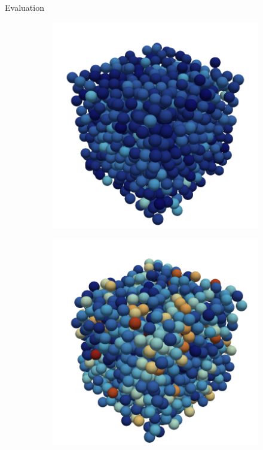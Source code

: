 \begin{frame}[c]{Evaluation}{}
{\begin{figure}[htpb]
\begin{subfigure}[c]{.3\textwidth}
			\includegraphics[width=\textwidth]{equilibrium/render/t10000.png}
		\end{subfigure}%
		\begin{subfigure}[c]{.3\textwidth}
			\includegraphics[width=\textwidth]{equilibrium/render/t50000.png}

\end{subfigure}
\end{figure}}
\end{frame}
